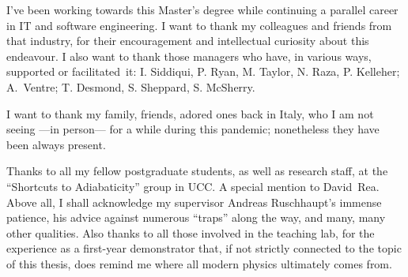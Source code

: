 {
  \noindent
  I've been working towards this Master's degree
  while continuing a parallel career
  in IT and software engineering.
  I want to thank my
  colleagues and friends from that industry, for their encouragement
  and intellectual curiosity
  about this endeavour.
  I also want to thank those managers
  who have, in various ways, supported or facilitated~it:
  I. Siddiqui, P. Ryan, M. Taylor, N. Raza, P. Kelleher;
  A.~Ventre;
  T. Desmond, S. Sheppard, S. McSherry.

  I want to thank my family, friends, adored ones back in Italy,
  who I am not seeing ---in person--- for a while during this pandemic;
  nonetheless they have been always present.

  Thanks to all my fellow postgraduate students,
  as well as research staff,
  at the ``Shortcuts to Adiabaticity'' group in UCC.
  A special mention to David~Rea.
  Above all, I shall acknowledge my supervisor Andreas Ruschhaupt's immense patience,
  his advice against numerous ``traps'' along the way, and many, many other qualities.
  Also thanks to all those involved in the teaching lab, for the experience as a
  first-year demonstrator that,
  if not strictly connected to the topic of this thesis,
  does remind me where all modern physics ultimately comes from.
}
